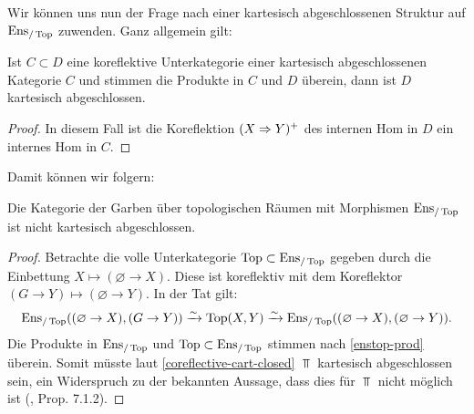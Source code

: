 Wir können uns nun der Frage nach einer kartesisch abgeschlossenen
Struktur auf $\operatorname{Ens}_{/\operatorname{Top}}$ zuwenden. Ganz allgemein gilt:
\begin{prop}
  Ist $C \subset D$ eine koreflektive Unterkategorie einer kartesisch
  abgeschlossenen Kategorie $C$ und stimmen die Produkte in $C$ und
  $D$ überein, dann ist $D$ kartesisch abgeschlossen.
\end{prop}
\begin{proof}
  In diesem Fall ist die Koreflektion $(X \Rightarrow Y)^+$ des internen Hom
  in $D$ ein internes Hom in $C$.
\end{proof}

Damit können wir folgern:
\begin{prop} \label{full-enstop-not-cart-closed}
  Die Kategorie der Garben über topologischen Räumen mit Morphismen
  $\operatorname{Ens}_{/\operatorname{Top}}$ ist nicht kartesisch abgeschlossen.
\end{prop}
\begin{proof}
  Betrachte die volle Unterkategorie $\operatorname{Top} \subset \operatorname{Ens}_{/\operatorname{Top}}$ gegeben
  durch die Einbettung $X \mapsto (\varnothing \to X)$. Diese ist
  koreflektiv mit dem Koreflektor $(G \to Y) \mapsto (\varnothing \to
  Y)$. In der Tat gilt:
  \[ \operatorname{Ens}_{/\operatorname{Top}}((\varnothing \to X), (G \to Y)) \xrightarrow[]{\sim} \operatorname{Top}(X, Y)
  \xrightarrow[]{\sim} \operatorname{Ens}_{/\operatorname{Top}}((\varnothing \to X), (\varnothing \to Y)).
  \]
  Die Produkte in $\operatorname{Ens}_{/\operatorname{Top}}$ und $\operatorname{Top} \subset \operatorname{Ens}_{/\operatorname{Top}}$ stimmen nach
  \ref{enstop-prod} überein. Somit müsste laut
  \ref{coreflective-cart-closed} $\Top$ kartesisch abgeschlossen sein,
  ein Widerspruch zu der bekannten Aussage, dass dies für $\Top$ nicht
  möglich ist (\cite{Borceux}, Prop. 7.1.2).
\end{proof}


